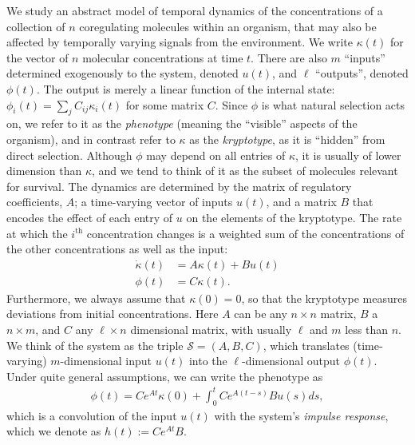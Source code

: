 \documentclass{article}
\newcommand{\1}{\mathbbm{1}}
\begin{document}
We study an abstract model of temporal dynamics of the concentrations of a collection of $n$ coregulating molecules
within an organism, that may also be affected by temporally varying signals from the environment.
We write $\kappa(t)$ for the vector of $n$ molecular concentrations at time $t$.
There are also $m$ ``inputs'' determined exogenously to the system, denoted $u(t)$,
and $\ell$ ``outputs'', denoted $\phi(t)$.
The output is merely a linear function of the internal state:
$\phi_i(t) = \sum_j C_{ij} \kappa_i(t)$
for some matrix $C$.
Since $\phi$ is what natural selection acts on, we refer to it as the \emph{phenotype}
(meaning the ``visible'' aspects of the organism),
and in contrast refer to $\kappa$ as the \emph{kryptotype},
as it is ``hidden'' from direct selection.
Although $\phi$ may depend on all entries of $\kappa$,
it is usually of lower dimension than $\kappa$,
and we tend to think of it as the subset of molecules relevant for survival.
The dynamics are determined by
the matrix of regulatory coefficients, $A$;
a time-varying vector of inputs $u(t)$,
and a matrix $B$ that encodes the effect of each entry of $u$ on the elements of the kryptotype.
The rate at which the $i^\text{th}$ concentration changes
is a weighted sum of the concentrations of the other concentrations
as well as the input:
\begin{equation}\label{eqn:system}
   \begin{aligned}
    \dot{\kappa}(t) &= A \kappa(t) + B u(t) \\
    \phi(t) &= C \kappa(t) .
  \end{aligned} 
\end{equation}
Furthermore, we always assume that $\kappa(0) = 0$,
so that the kryptotype measures deviations from initial concentrations. 
Here $A$ can be any $n \times n$ matrix, $B$ a $n \times m$, and $C$ any $\ell \times n$ dimensional matrix,
with usually $\ell$ and $m$ less than $n$.
We think of the system as the triple $\mathcal{S} = (A,B,C)$,
which translates (time-varying) $m$-dimensional input $u(t)$ into the $\ell$-dimensional output $\phi(t)$.
Under quite general assumptions,
we can write the phenotype as
  \begin{align}
    \phi(t) = C e^{A t} \kappa(0) + \int_{0}^{t} C e^{A (t-s)} B u(s) ds ,
  \end{align}
which is a convolution of the input $u(t)$ with the system's \emph{impulse response},
which we denote as $h(t) := Ce^{A t}B$.
\end{document}
